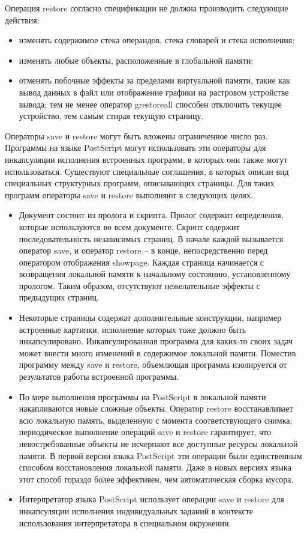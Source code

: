 Операция restore согласно спецификации не должна производить следующие действия:
\begin{itemize}
\item изменять содержимое стека операндов, стека словарей и стека исполнения; 
\item изменять любые объекты, расположенные в глобальной памяти;
\item отменять побочные эффекты за пределами виртуальной памяти, такие как вывод данных в файл или отображение графики на растровом устройстве вывода; тем не менее оператор grestoreall способен отключить текущее устройство, тем самым стирая текущую страницу.
\end{itemize}

Операторы save и restore могут быть вложены ограниченное число раз. Программы на языке PostScript могут использовать эти операторы для инкапсуляции исполнения встроенных программ, в которых они также могут использоваться.
Существуют специальные соглашения, в которых описан вид специальных структурных программ, описывающих страницы. Для таких программ операторы save и restore выполняют в следующих целях.
\begin{itemize}
\item Документ состоит из пролога и скрипта. Пролог содержит определения, которые используются во всем документе. Скрипт содержит последовательность независимых страниц. В начале каждой вызывается оператор save, и оператор restore – в конце, непосредственно перед оператором отображения showpage. Каждая страница начинается с возвращения локальной памяти к начальному состоянию, установленному прологом. Таким образом, отсутствуют нежелательные эффекты с предыдущих страниц.
\item Некоторые страницы содержат дополнительные конструкции, например встроенные картинки, исполнение которых тоже должно быть инкапсулировано. Инкапсулированная программа для каких-то своих задач может внести много изменений в содержимое локальной памяти. Поместив программу между save и restore, объемлющая программа  изолируется от результатов работы встроенной программы.
\item По мере выполнения программы на PostScript в локальной памяти накапливаются новые сложные объекты. Оператор restore восстанавливает всю локальную память, выделенную с момента соответствующего снимка; периодическое выполнение операций save и restore гарантирует, что невостребованные объекты не исчерпают все доступные ресурсы локальной памяти. В первой версии языка PostScript эти операции были единственным способом восстановления локальной памяти. Даже в новых версиях языка этот способ гораздо более эффективен, чем автоматическая сборка мусора.
\item Интерпретатор языка PostScript использует операции save и restore для инкапсуляции исполнения индивидуальных заданий в контексте использования интерпретатора в специальном окружении.
\end{itemize}

